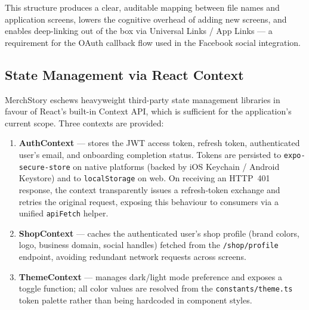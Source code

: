 \documentclass[12pt, a4paper]{report}
\begin{document}
\medskip\noindent
This structure produces a clear, auditable mapping between file names and
application screens, lowers the cognitive overhead of adding new screens, and
enables deep-linking out of the box via Universal Links / App Links --- a
requirement for the OAuth callback flow used in the Facebook social
integration.

\subsection{State Management via React Context}

MerchStory eschews heavyweight third-party state management libraries in favour
of React's built-in Context API, which is sufficient for the application's
current scope.  Three contexts are provided:

\begin{enumerate}[leftmargin=*, label=\arabic*.]
  \item \textbf{AuthContext} --- stores the JWT access token, refresh token,
    authenticated user's email, and onboarding completion status.  Tokens are
    persisted to \texttt{expo-secure-store} on native platforms (backed by
    iOS Keychain / Android Keystore) and to \texttt{localStorage} on web.
    On receiving an HTTP~401 response, the context transparently issues a
    refresh-token exchange and retries the original request, exposing this
    behaviour to consumers via a unified \texttt{apiFetch} helper.

  \item \textbf{ShopContext} --- caches the authenticated user's shop profile
    (brand colors, logo, business domain, social handles) fetched from the
    \texttt{/shop/profile} endpoint, avoiding redundant network requests
    across screens.

  \item \textbf{ThemeContext} --- manages dark/light mode preference and
    exposes a toggle function; all color values are resolved from the
    \texttt{constants/theme.ts} token palette rather than being hardcoded
    in component styles.
\end{enumerate}
\end{document}
